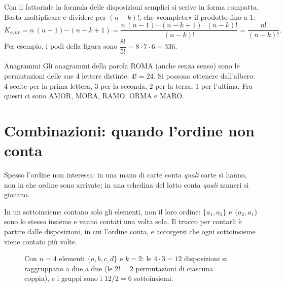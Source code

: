 Con il fattoriale la formula delle disposizioni semplici si scrive in forma compatta. Basta moltiplicare e dividere
per $(n-k)!$, che «completa» il prodotto fino a 1:
\[
  K_{o,nr} = n\,(n-1) \cdots (n-k+1) = \frac{n\,(n-1) \cdots (n-k+1) \cdot (n-k)!}{(n-k)!} = \frac{n!}{(n-k)!} .
\]
Per esempio, i podi della figura sono $\dfrac{8!}{5!} = 8 \cdot 7 \cdot 6 = 336$.

\begin{esempio}{Anagrammi}
Gli anagrammi della parola ROMA (anche senza senso) sono le permutazioni delle sue 4 lettere distinte:
$4! = 24$. Si possono ottenere dall'albero: 4 scelte per la prima lettera, 3 per la seconda, 2 per la terza, 1 per
l'ultima. Fra questi ci sono AMOR, MORA, RAMO, ORMA e MARO.
\end{esempio}

\section{Combinazioni: quando l'ordine non conta}

Spesso l'ordine non interessa: in una mano di carte conta \emph{quali} carte si hanno, non in che ordine sono
arrivate; in una schedina del lotto conta \emph{quali} numeri si giocano.


In un sottoinsieme contano solo gli elementi, non il loro ordine: $\{a_1, a_2\}$ e $\{a_2, a_1\}$ sono lo stesso
insieme e vanno contati una volta sola. Il trucco per contarli è partire dalle disposizioni, in cui l'ordine conta, e
accorgersi che ogni sottoinsieme viene contato più volte.

\begin{figure}[H]
\centering
{}
\caption{Con $n = 4$ elementi $\{a, b, c, d\}$ e $k = 2$: le $4 \cdot 3 = 12$ disposizioni si raggruppano a due a due
(le $2! = 2$ permutazioni di ciascuna coppia), e i gruppi sono i $12 / 2 = 6$ sottoinsiemi.}
\end{figure}

